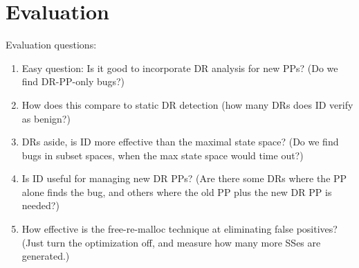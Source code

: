 \section{Evaluation}


Evaluation questions:
\begin{enumerate}
	\item Easy question: Is it good to incorporate DR analysis for new PPs? (Do we find DR-PP-only bugs?)
	\item How does this compare to static DR detection (how many DRs does ID verify as benign?)
	\item DRs aside, is ID more effective than the maximal state space? (Do we find bugs in subset spaces, when the max state space would time out?)
	\item Is ID useful for managing new DR PPs? (Are there some DRs where the PP alone finds the bug, and others where the old PP plus the new DR PP is needed?)
	\item How effective is the free-re-malloc technique at eliminating false positives? (Just turn the optimization off, and measure how many more SSes are generated.)




\end{enumerate}
